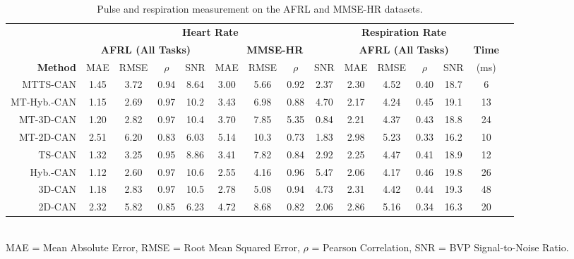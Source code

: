 \documentclass{article}
\begin{document}
\begin{table*}[t]
	\footnotesize
	\caption{Pulse and respiration measurement on the AFRL and MMSE-HR datasets.}
	\label{tab:SM_AFRL_MMSE}
	\centering
	\setlength\tabcolsep{3pt} \begin{tabular}{r|cccc|cccc|cccc|cc}
	\toprule
		& \multicolumn{8}{c}{\textbf{Heart Rate}} & \multicolumn{4}{c}{\textbf{Respiration Rate}} \\
		& \multicolumn{4}{c}{\textbf{AFRL (All Tasks) }} &  \multicolumn{4}{c}{\textbf{MMSE-HR}}  & \multicolumn{4}{c}{\textbf{AFRL (All Tasks) }} & \textbf{Time}\\
        \textbf{Method} & MAE & RMSE & $\rho$ & SNR & MAE & RMSE & $\rho$ & SNR & MAE & RMSE & $\rho$ & SNR & (ms)\\ \hline \hline
        MTTS-CAN & 1.45 &  3.72 & 0.94 & 8.64 & 3.00 & 5.66 & 0.92 & 2.37 & 2.30 & 4.52 & 0.40 & 18.7 & 6 \\
        MT-Hyb.-CAN & 1.15 & 2.69 & 0.97 & 10.2 & 3.43 & 6.98 & 0.88 & 4.70 & 2.17 & 4.24 & 0.45 & 19.1 & 13 \\ 
        MT-3D-CAN & 1.20 & 2.82 & 0.97 & 10.4 & 3.70 & 7.85 & 5.35 & 0.84 & 2.21 & 4.37 & 0.43 & 18.8 & 24\\
        MT-2D-CAN & 2.51 & 6.20 & 0.83 & 6.03 & 5.14 & 10.3 & 0.73 & 1.83 & 2.98 & 5.23 & 0.33 & 16.2 & 10\\
        TS-CAN & 1.32 &  3.25 & 0.95 & 8.86 & 3.41 & 7.82 & 0.84  & 2.92  & 2.25 & 4.47 & 0.41 & 18.9 & 12 \\
        Hyb.-CAN & 1.12 & 2.60 & 0.97 & 10.6 & 2.55 & 4.16 & 0.96 & 5.47  & 2.06 & 4.17 & 0.46 & 19.8 & 26 \\
        3D-CAN & 1.18 & 2.83 & 0.97 & 10.5 & 2.78 & 5.08 & 0.94 & 4.73 & 2.31 & 4.42 & 0.44 & 19.3 & 48  \\ \hdashline
        2D-CAN & 2.32 & 5.82 & 0.85 & 6.23 & 4.72 & 8.68 &  0.82 & 2.06  & 2.86 & 5.16 & 0.34 & 16.3 & 20  \\
        \bottomrule 
   \end{tabular}
   \\
   \tiny
   MAE = Mean Absolute Error, RMSE = Root Mean Squared Error, $\rho$ = Pearson Correlation, SNR = BVP Signal-to-Noise Ratio.
   \vspace{-0.4cm}
\end{table*}
\end{document}
